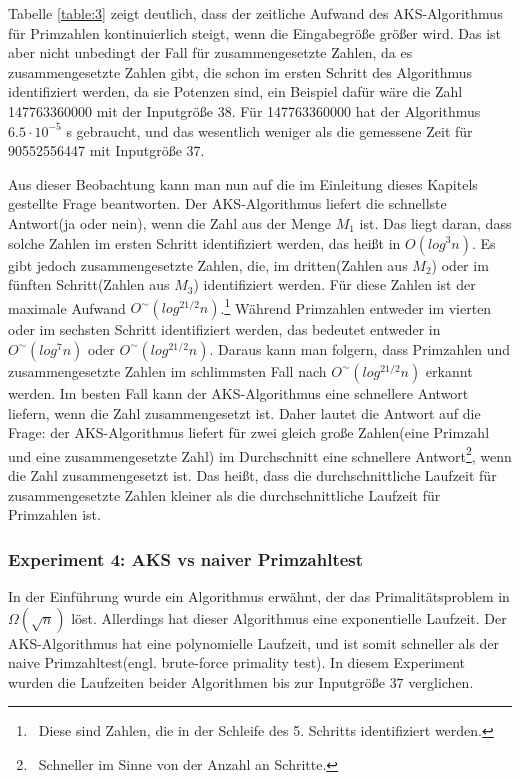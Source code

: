 \documentclass[12pt,oneside]{article}
\theoremstyle{remark}
\theoremstyle{definition}
\begin{document}
Tabelle \ref{table:3} zeigt deutlich, dass der zeitliche Aufwand des AKS-Algorithmus für Primzahlen kontinuierlich steigt, wenn die Eingabegröße größer wird. Das ist aber nicht unbedingt der Fall für zusammengesetzte Zahlen, da es zusammengesetzte Zahlen gibt, die schon im ersten Schritt des Algorithmus identifiziert werden, da sie Potenzen sind, ein Beispiel dafür wäre die Zahl 147763360000 mit der Inputgröße 38. Für 147763360000 hat der Algorithmus $6.5 \cdot 10^{-5}$ s gebraucht, und das wesentlich weniger als die gemessene Zeit für 90552556447 mit Inputgröße 37.

Aus dieser Beobachtung kann man nun auf die im Einleitung dieses Kapitels gestellte Frage beantworten. Der AKS-Algorithmus liefert die schnellste Antwort(ja oder nein), wenn die Zahl aus der Menge $M_1$ ist. Das liegt daran, dass solche Zahlen im ersten Schritt identifiziert werden, das heißt in $O(log^3 n)$. Es gibt jedoch zusammengesetzte Zahlen, die, im dritten(Zahlen aus $M_2$) oder im fünften Schritt(Zahlen aus $M_3$) identifiziert werden. Für diese Zahlen ist der maximale Aufwand $O^{\sim}(log^{21/2}n)$.\footnote{$\,$ Diese sind Zahlen, die in der Schleife des 5. Schritts identifiziert werden.} Während Primzahlen entweder im vierten oder im sechsten Schritt identifiziert werden, das bedeutet entweder in $O^{\sim}(log^7n)$ oder $O^{\sim}(log^{21/2}n)$. Daraus kann man folgern, dass Primzahlen und zusammengesetzte Zahlen im schlimmsten Fall nach $O^{\sim}(log^{21/2}n)$ erkannt werden. Im besten Fall kann der AKS-Algorithmus eine schnellere Antwort liefern, wenn die Zahl zusammengesetzt ist. Daher lautet die Antwort auf die Frage: der AKS-Algorithmus liefert für zwei gleich große Zahlen(eine Primzahl und eine zusammengesetzte Zahl) im Durchschnitt eine schnellere Antwort\footnote{$\,$ Schneller im Sinne von der Anzahl an Schritte.}, wenn die Zahl zusammengesetzt ist. Das heißt, dass die durchschnittliche Laufzeit für zusammengesetzte Zahlen kleiner als die durchschnittliche Laufzeit für Primzahlen ist.      

\subsubsection{Experiment 4: AKS vs naiver Primzahltest}
In der Einführung wurde ein Algorithmus erwähnt, der das Primalitätsproblem in $\Omega(\sqrt{n})$ löst. Allerdings hat dieser Algorithmus eine exponentielle Laufzeit. Der AKS-Algorithmus hat eine polynomielle Laufzeit, und ist somit schneller als der naive Primzahltest(engl. brute-force primality test). In diesem Experiment wurden die Laufzeiten beider Algorithmen bis zur Inputgröße $37$ verglichen.  
\end{document}

